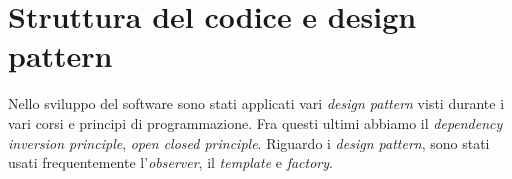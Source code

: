 \section{Struttura del codice e design pattern}
Nello sviluppo del software sono stati applicati vari \textit{design pattern} visti durante i vari corsi e principi di programmazione. Fra questi ultimi abbiamo il \textit{dependency inversion principle}, \textit{open closed principle}. Riguardo i \textit{design pattern}, sono stati usati frequentemente l'\textit{observer}, il \textit{template} e \textit{factory}.

